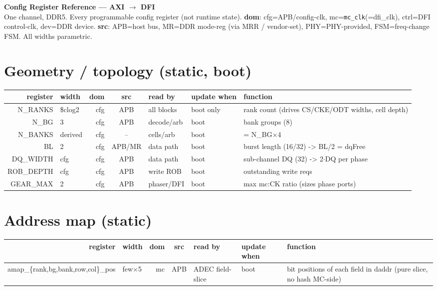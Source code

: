 \documentclass[9pt]{extarticle}
\newenvironment{cfg}{%
  \footnotesize\begin{longtable}{R W D S B U F}
  \rowcolor{hb}\textbf{register} & \textbf{width} & \textbf{dom} & \textbf{src} & \textbf{read by} & \textbf{update when} & \textbf{function}\\ \midrule\endhead}
  {\bottomrule\end{longtable}}
\begin{document}
\begin{center}
{\LARGE\textbf{Config Register Reference --- AXI $\rightarrow$ DFI}}\\[2pt]
{\small One channel, DDR5. Every programmable config register (not runtime state).
\textbf{dom}: cfg=APB/config-clk, mc=\texttt{mc\_clk}(=dfi\_clk), ctrl=DFI control-clk, dev=DDR device.
\textbf{src}: APB=host bus, MR=DDR mode-reg (via MRR / vendor-set), PHY=PHY-provided, FSM=freq-change FSM.
All widths parametric.}
\end{center}

\section{Geometry / topology  (static, boot)}
\begin{cfg}
N\_RANKS & \$clog2 & cfg & APB & all blocks & boot only & rank count (drives CS/CKE/ODT widths, cell depth)\\
N\_BG & 3 & cfg & APB & decode/arb & boot & bank groups (8)\\
N\_BANKS & derived & cfg & -- & cells/arb & boot & = N\_BG$\times$4\\
BL & 2 & cfg & APB/MR & data path & boot & burst length (16/32) -> BL/2 = dqFree\\
DQ\_WIDTH & cfg & cfg & APB & data path & boot & sub-channel DQ (32) -> 2$\cdot$DQ per phase\\
ROB\_DEPTH & cfg & cfg & APB & write ROB & boot & outstanding write reqs\\
GEAR\_MAX & 2 & cfg & APB & phaser/DFI & boot & max mc:CK ratio (sizes phase ports)\\
\end{cfg}

\section{Address map  (static)}
\begin{cfg}
amap\_\{rank,bg,bank,row,col\}\_pos & few$\times$5 & mc & APB & ADEC field-slice & boot & bit positions of each field in daddr (pure slice, no hash MC-side)\\
\end{cfg}
\end{document}
